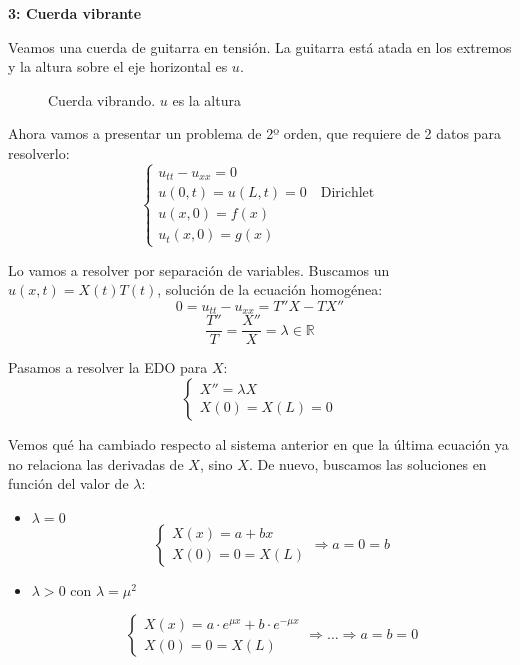 		\clearpage %
		\begin{example}{\bf 3: Cuerda vibrante}

			Veamos una cuerda de guitarra en tensión. La guitarra está atada en los extremos y la altura sobre el eje horizontal es $u$.

			\begin{figure}[thbp]
			\centering
			\caption{Cuerda vibrando. $u$ es la altura}
			\label{fig:cuerdaGuitarra}
			\end{figure}

			Ahora vamos a presentar un problema de 2º orden, que requiere de 2 datos para resolverlo:
			\[  \begin{cases}
				u_{tt} - u_{xx} = 0\\
				u(0,t) = u(L,t) = 0 \quad \text{Dirichlet}\\
				u(x,0) = f(x) \\
				u_t(x,0) = g(x)
				\end{cases}
			\]

			Lo vamos a resolver por separación de variables. Buscamos un $u(x,t) = X(t) T(t)$, solución de la ecuación homogénea:
			\[ 0 = u_{tt} - u_{xx} = T'' X - T X''\]
			\[ \frac{T''}{T} = \frac{X''}{X} = \lambda \in \mathbb{R}\]

			Pasamos a resolver la EDO para $X$:
			\[\begin{cases}
				X'' = \lambda X \\
				X(0) = X(L) = 0
			\end{cases}
			\]

			Vemos qué ha cambiado respecto al sistema anterior en que la última ecuación ya no relaciona las derivadas de $X$, sino $X$. De nuevo, buscamos las soluciones en función del valor de $\lambda$:

			\begin{itemize}
				\item $\lambda = 0$
					\[
					\left\{
					\begin{array}{l}
					X(x) = a + bx \\
					X(0) = 0 = X(L)
					\end{array}
					\right.
					\Rightarrow
					a = 0 = b
					\]

				\item $\lambda > 0$ con $\lambda = \mu^2$

					\[
					\left\{
					\begin{array}{l}
					X(x) = a \cdot e^{\mu x} + b \cdot e^{-\mu x} \\
					X(0) = 0 = X(L)
					\end{array}
					\right.
					\Rightarrow … \Rightarrow
					a = b = 0
					\]


\end{itemize}
\end{example}
